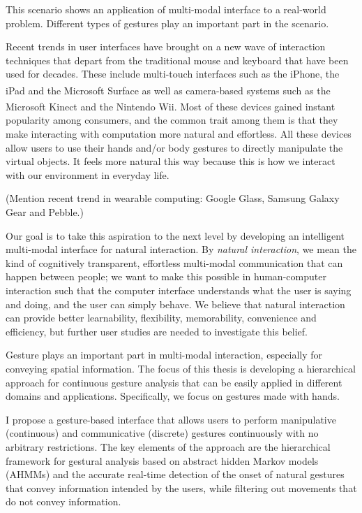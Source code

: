 This scenario shows an application of multi-modal interface to a
real-world problem. Different types of gestures play an important part in the
scenario.
 
Recent trends in user interfaces have brought on a new wave of interaction
techniques that depart from the traditional mouse and keyboard that have been 
used for decades. These include multi-touch interfaces such as the 
iPhone, the iPad and the Microsoft 
Surface\textsuperscript{\textregistered} as well as camera-based systems such as
the Microsoft Kinect and the Nintendo\textsuperscript{\textregistered} Wii. Most
of these devices gained instant popularity among consumers, and the common trait
among them is that they make interacting with computation more natural and 
effortless. All these devices allow users to use their hands and/or body 
gestures to directly manipulate the virtual objects. It feels more natural this 
way because this is how we interact with our environment in everyday life.
 
(Mention recent trend in wearable computing: Google Glass, Samsung Galaxy Gear
and Pebble.) 

Our goal is to take this aspiration to the next level by developing
an intelligent multi-modal interface for natural interaction. By \textit{natural
interaction}, we mean the kind of cognitively transparent, effortless
multi-modal communication that can happen between people; we want to make this possible in
human-computer interaction such that the computer interface understands what the
user is saying and doing, and the user can simply behave. We believe that
natural interaction can provide better learnability, flexibility, memorability,
convenience and efficiency, but further user studies are needed to investigate
this belief.

Gesture plays an important part in multi-modal interaction, especially for
conveying spatial information. The focus of this thesis is developing a
hierarchical approach for continuous gesture analysis that can be easily
applied in different domains and applications. Specifically, we focus on
gestures made with hands. 

I propose a gesture-based interface that allows users to perform
manipulative (continuous) and communicative (discrete) gestures continuously
with no arbitrary restrictions. The key elements of the approach are the hierarchical framework
for gestural analysis based on abstract hidden Markov models (AHMMs) and the
accurate real-time detection of the onset of natural gestures that convey 
information intended by the users, while filtering out movements that do not 
convey information.

